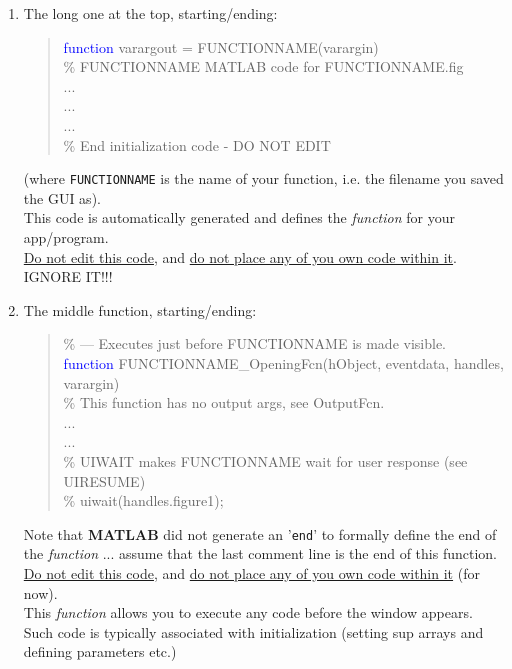 \documentclass{tufte-book} %
\newenvironment{docspecmargin}{\begin{quotation}\ttfamily\footnotesize\parskip0pt\parindent0pt\ignorespaces}{\end{quotation}}
\begin{document}
\begin{enumerate}[noitemsep]
\vspace{1mm}
\item The long one at the top, starting/ending:
\begin{docspecmargin}
\textcolor{blue}{function} varargout = FUNCTIONNAME(varargin)\\
\textcolor[rgb]{0,0.501961,0}{\% FUNCTIONNAME MATLAB code for FUNCTIONNAME.fig}\\
...\\
...\\
...\\
\textcolor[rgb]{0,0.501961,0}{\% End initialization code - DO NOT EDIT}
\end{docspecmargin}
(where \texttt{FUNCTIONNAME} is the name of your function, i.e. the filename you saved the GUI as).
\\This code is automatically generated and defines the \textit{function} for your app/program.
\\\uline{Do not edit this code}, and \uline{do not place any of you own code within it}. IGNORE IT!!!
\vspace{1mm}
\item  The middle function, starting/ending:
\begin{docspecmargin}
\textcolor[rgb]{0,0.501961,0}{\% --- Executes just before FUNCTIONNAME is made visible.}\\
\textcolor{blue}{function} FUNCTIONNAME\_OpeningFcn(hObject, eventdata, handles, varargin)\\
\textcolor[rgb]{0,0.501961,0}{\% This function has no output args, see OutputFcn.}\\
...\\
...\\
\textcolor[rgb]{0,0.501961,0}{\% UIWAIT makes FUNCTIONNAME wait for user response (see UIRESUME)\\}
\textcolor[rgb]{0,0.501961,0}{\% uiwait(handles.figure1);}
\end{docspecmargin}
Note that \textbf{MATLAB} did not generate an '\texttt{end}' to formally define the end of the \textit{function} ... assume that the last comment line is the end of this function.
\\\uline{Do not edit this code}, and \uline{do not place any of you own code within it} (for now).
\\This \textit{function} allows you to execute any code before the window appears. Such code is typically associated with initialization (setting sup arrays and defining parameters etc.)

\end{enumerate}
\end{document}
